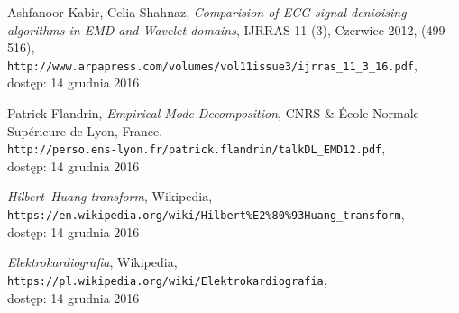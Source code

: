 \begin{thebibliography}{9}
        Ashfanoor Kabir, Celia Shahnaz, 
        \textit{Comparision of ECG signal denioising algorithms in EMD and
        Wavelet domains}, IJRRAS 11 (3), Czerwiec 2012, (499--516),\\
        \verb+http://www.arpapress.com/volumes/vol11issue3/ijrras_11_3_16.pdf+,\\
        dostęp: 14 grudnia 2016
        
        Patrick Flandrin,
        \textit{Empirical Mode Decomposition}, CNRS \& École Normale Supérieure
        de Lyon, France,\\
        \verb+http://perso.ens-lyon.fr/patrick.flandrin/talkDL_EMD12.pdf+,\\
        dostęp: 14 grudnia 2016
        
        \textit{Hilbert--Huang transform}, Wikipedia,\\
        \verb+https://en.wikipedia.org/wiki/Hilbert%E2%80%93Huang_transform+,\\
        dostęp: 14 grudnia 2016
        
        \textit{Elektrokardiografia}, Wikipedia,\\
        \verb+https://pl.wikipedia.org/wiki/Elektrokardiografia+,\\
        dostęp: 14 grudnia 2016

\end{thebibliography}
